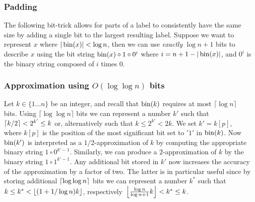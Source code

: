 	\subsubsection{Padding}\label{tec:padding}
	The following bit-trick allows for parts of a label to consistently have the same size by adding a single bit to the largest resulting label.
	Suppose we want to represent $x$ where  $\vert \operatorname{bin}(x) \vert < \log n$, then we can use \textit{exactly} $\log n +1$ bits to describe $x$ using the bit string $\operatorname{bin}(x) \circ 1 \circ 0^i$ where $i=n+1 - \vert \operatorname{bin}(x) \vert$, and  $0^i$ is the binary string composed of $i$ times $0$.
		
	\subsubsection{Approximation using $O(\log\log n)$ bits}\label{tec:approx}
	 Let $k \in  \{1 \dots n\}$ be an integer, and recall that  $\operatorname{bin}(k)$ requires at most $\lceil \log n \rceil$ bits. Using $\lceil \log \log n \rceil$ bits we can represent a number $k'$ such that $\left\lceil{k/2}\right\rceil < 2^{k'} \leq k$ or, alternatively such that $k \leq 2^{k'} < 2k$.
	We  set  $k' =  k[p]$,  where $k[p]$ is the position of the most significant bit set to $'1'$ in $\operatorname{bin}(k)$.
	 Now $\operatorname{bin}(k')$ is interpreted as a $1/2$-approximation of $k$  by computing the appropriate  binary string $1 \circ 0^{k'-1}$. 
	Similarly, we can produce a $2$-approximation of $k$ by  the  binary string $1 \circ 1^{k'-1}$.
	Any additional bit stored in $k'$ now increases the accuracy of the approximation by a factor of two.
	The latter is in particular useful since by storing  additional  $\left\lceil{ \log \log n }\right\rceil$ bits we can represent a number $k^*$ such that $k \leq k^* < \left\lfloor{(1+1/ \log n)k}\right\rfloor$, respectively~$\left\lfloor{\frac{\log n}{\log n+1}k}\right\rfloor < k^* \leq k$.

